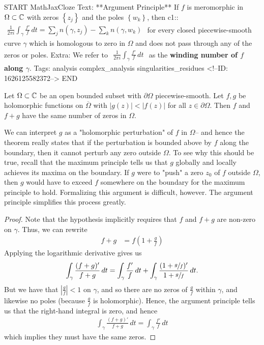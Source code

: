 \documentclass{memoir}
\begin{document}
\begin{anki}
START
MathJaxCloze
Text: **Argument Principle**
If \(f\) is meromorphic in \(\Omega\subset \mathbb{C} \) with zeros \(\left\{ z_j \right\}\) and the poles \(\left\{ w_k \right\} \), then
{{c1::\(\begin{align*}
        	\frac{1}{2\pi i} \int_{\gamma} \frac{f'}{f} \,d t = \sum_{j} n(\gamma,z_j) - \sum_{k} n(\gamma,w_k) 
        \end{align*}\)}}
	for every closed piecewise-smooth curve \(\gamma\) which is homologous to zero in \(\Omega \) and does not pass through any of the zeros or poles.
Extra: We refer to
\(\begin{align*}
  	\frac{1}{2\pi i} \int_\gamma \frac{f'}{f}\,d t
  \end{align*}\)
as the \textbf{winding number of \(f\) along \(\gamma \)}.
Tags: analysis complex_analysis singularities_residues
<!--ID: 1626125582372-->
END
\end{anki}


\begin{cor}
	Let \(\Omega \subset \mathbb{C}\) be an open bounded subset with \(\partial \Omega \) piecewise-smooth. Let \(f,g\) be holomorphic functions on \(\overline{\Omega }\) with \(\left| g(z) \right| < \left| f(z) \right| \) for all \(z \in \partial\Omega \). Then \(f\) and \(f+g\) have the same number of zeros in \(\Omega \).
\end{cor}
We can interpret \(g\) as a "holomorphic perturbation" of \(f\) in \(\Omega \)-- and hence the theorem really states that if the perturbation is bounded above by \(f\) along the boundary, then it cannot perturb any zero outside \(\Omega \). To see why this should be true, recall that the maximum principle tells us that \(g\) globally and locally achieves its maxima on the boundary. If \(g\) were to "push" a zero \(z_0\) of \(f\) outside \(\Omega \), then \(g\) would have to exceed \(f\) somewhere on the boundary for the maximum principle to hold. Formalizing this argument is difficult, however. The argument principle simplifies this process greatly.
\begin{proof}
	Note that the hypothesis implicitly requires that \(f\) and \(f+g\) are non-zero on \(\gamma \). Thus, we can rewrite
	\begin{align*}
		f+g &= f\left( 1+ \frac{g}{f} \right)
	\end{align*}
	Applying the logarithmic derivative gives us
	\begin{align*}
		\int_\gamma \frac{(f+g)'}{f+g}\,d t = \int_\gamma \frac{f'}{f} \,d t + \int_{\gamma }\frac{(1+\sfrac{g}{f})'}{1+\sfrac{g}{f}} \,d t.
	\end{align*}
	But we have that \(\left| \frac{g}{f} \right|<1\) on \(\gamma \), and so there are no zeros of \(\frac{g}{f}\) within \(\gamma \), and likewise no poles (because \(\frac{g}{f}\) is holomorphic). Hence, the argument principle tells us that the right-hand integral is zero, and hence
	\begin{align*}
		\int_\gamma \frac{(f+g)'}{f+g} \,d t = \int_\gamma \frac{f'}{f}\,d t
	\end{align*}
	which implies they must have the same zeros.
\end{proof}
\end{document}
